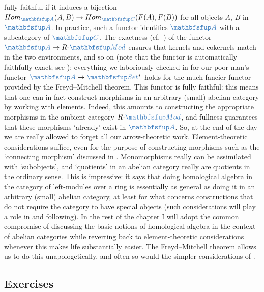 fully faithful if it induces a bijection
$\Hom_{\categ{A}}(A,B) \to \Hom_{\categ{C}}(F(A),F(B))$ for all
objects $A$, $B$ in $\categ{A}$. In practice, such a functor
identifies $\categ{A}$ with a subcategory of $\categ{C}$. The
exactness (cf.\ ) of the functor
$\categ{A} \to R\text{-}\categ{Mod}$ ensures that kernels and
cokernels match in the two environments, and so on (note that the
functor is automatically faithfully exact; see
): everything
we laboriously checked in
for our poor man's functor $\categ{A} \to \categ{Set}^*$ holds for the
much fancier functor provided by the Freyd--Mitchell theorem.  This
functor is fully faithful: this means that one can in fact construct
morphisms in an arbitrary (small) abelian category by working with
elements. Indeed, this amounts to constructing the appropriate
morphisms in the ambient category $R\text{-}\categ{Mod}$, and fullness
guarantees that these morphisms `already' exist in $\categ{A}$.  So,
at the end of the day we are really allowed to forget all our
arrow-theoretic work. Element-theoretic considerations suffice, even
for the purpose of constructing morphisms such as the `connecting
morphism' discussed in
. Monomorphisms really can
be assimilated with `subobjects', and `quotients' in an abelian
category really are quotients in the ordinary sense.  This is
impressive: it says that doing homological algebra in the category of
left-modules over a ring is essentially as general as doing it in an
arbitrary (small) abelian category, at least for what concerns
constructions that do not require the category to have special objects
(such considerations will play a role in
and following). In the rest of the chapter I will adopt the common
compromise of discussing the basic notions of homological algebra in
the context of abelian categories while reverting back to
element-theoretic considerations whenever this makes life
substantially easier. The Freyd--Mitchell theorem allows us to do this
unapologetically, and often so would the simpler considerations of
.

\subsection*{Exercises}

